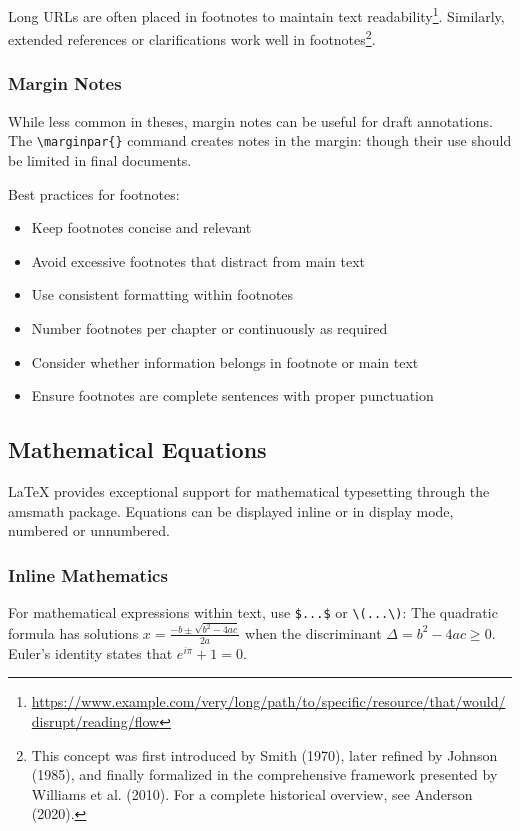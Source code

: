 Long URLs are often placed in footnotes to maintain text readability\footnote{\url{https://www.example.com/very/long/path/to/specific/resource/that/would/disrupt/reading/flow}}. Similarly, extended references or clarifications work well in footnotes\footnote{This concept was first introduced by Smith (1970), later refined by Johnson (1985), and finally formalized in the comprehensive framework presented by Williams et al. (2010). For a complete historical overview, see Anderson (2020).}.

\subsubsection{Margin Notes}

While less common in theses, margin notes can be useful for draft annotations. The \verb+\marginpar{}+ command creates notes in the margin: though their use should be limited in final documents.

Best practices for footnotes:
\begin{itemize}
    \item Keep footnotes concise and relevant
    \item Avoid excessive footnotes that distract from main text
    \item Use consistent formatting within footnotes
    \item Number footnotes per chapter or continuously as required
    \item Consider whether information belongs in footnote or main text
    \item Ensure footnotes are complete sentences with proper punctuation
\end{itemize}

\subsection{Mathematical Equations}

LaTeX provides exceptional support for mathematical typesetting through the amsmath package. Equations can be displayed inline or in display mode, numbered or unnumbered.

\subsubsection{Inline Mathematics}

For mathematical expressions within text, use \verb+$...$+ or \verb+\(...\)+: The quadratic formula has solutions $x = \frac{-b \pm \sqrt{b^2 - 4ac}}{2a}$ when the discriminant $\Delta = b^2 - 4ac \geq 0$. Euler's identity states that $e^{i\pi} + 1 = 0$.

